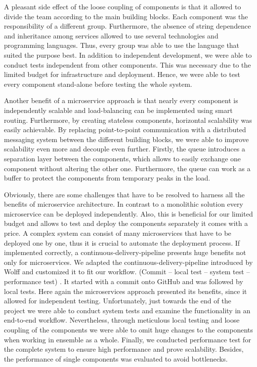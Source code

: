 A pleasant side effect of the loose coupling of components is that it
allowed to divide the team according to the main building blocks. Each
component was the responsibility of a different group. Furthermore, the
absence of string dependence and inheritance among services allowed to
use several technologies and programming languages. Thus, every group
was able to use the language that suited the purpose best. In addition
to independent development, we were able to conduct tests independent
from other components. This was necessary due to the limited budget for
infrastructure and deployment. Hence, we were able to test every
component stand-alone before testing the whole system.

Another benefit of a microservice approach is that nearly every
component is independently scalable and load-balancing can be
implemented using smart routing. Furthermore, by creating stateless
components, horizontal scalability was easily achievable. By replacing
point-to-point communication with a distributed messaging system between
the different building blocks, we were able to improve scalability even
more and decouple even further. Firstly, the queue introduces a
separation layer between the components, which allows to easily exchange
one component without altering the other one. Furthermore, the queue can
work as a buffer to protect the components from temporary peaks in the
load.

Obviously, there are some challenges that have to be resolved to harness
all the benefits of microservice architecture. In contrast to a
monolithic solution every microservice can be deployed independently.
Also, this is beneficial for our limited budget and allows to test and
deploy the components separately it comes with a price. A complex system
can consist of many microservices that have to be deployed one by one,
thus it is crucial to automate the deployment process. If implemented
correctly, a continuous-delivery-pipeline presents huge benefits not
only for microservices. We adapted the continuous-delivery-pipeline
introduced by Wolff and customized it to fit our workflow.
(Commit -- local test -- system test -- performance test) \cite{Wolff.2016}. It started with a commit onto
GitHub and was followed by local tests. Here again the microservices
approach presented its benefits, since it allowed for independent
testing. Unfortunately, just towards the end of the project we were able
to conduct system tests and examine the functionality in an end-to-end
workflow. Nevertheless, through meticulous local testing and loose
coupling of the components we were able to omit huge changes to the
components when working in ensemble as a whole. Finally, we conducted
performance test for the complete system to ensure high performance and
prove scalability. Besides, the performance of single components was
evaluated to avoid bottlenecks.


